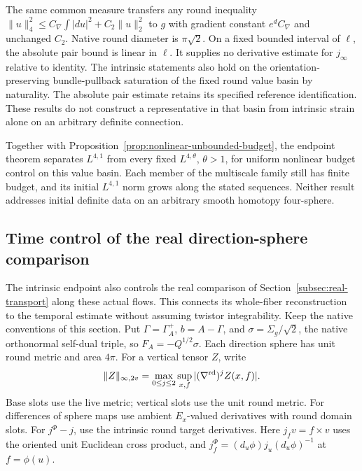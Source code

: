 \documentclass[11pt]{article}
\numberwithin{equation}{section}
\theoremstyle{definition}
\theoremstyle{remark}
\begin{document}
The same common measure transfers any round inequality
\(\|u\|_4^2\le C_\nabla\int|du|^2+C_2\|u\|_2^2\)
to \(g\) with gradient constant \(e^dC_\nabla\) and
unchanged \(C_2\). Native round diameter is \(\pi\sqrt2\).
On a fixed bounded interval of \(\ell\), the absolute
pair bound is linear in \(\ell\). It supplies no
derivative estimate for \(j_\infty\) relative to identity.
The intrinsic statements also hold on the orientation-preserving
bundle-pullback saturation of the fixed round value basin
by naturality.
The absolute pair estimate retains its specified reference
identification. These results do not construct a
representative in that basin from intrinsic strain alone
on an arbitrary definite connection.

Together with Proposition~\ref{prop:nonlinear-unbounded-budget},
the endpoint theorem separates \(L^{4,1}\) from every
fixed \(L^{4,\theta}\), \(\theta>1\), for uniform nonlinear
budget control on this value basin. Each member of the
multiscale family still has finite budget, and its
initial \(L^{4,1}\) norm grows along the stated sequences.
Neither result addresses initial definite data on
an arbitrary smooth homotopy four-sphere.


\subsection{Time control of the real direction-sphere comparison}
\label{subsec:real-comparison-time}

The intrinsic endpoint also controls the real comparison of
Section~\ref{subsec:real-transport} along these actual flows.
This connects its whole-fiber reconstruction to the temporal
estimate without assuming twistor integrability.
Keep the native conventions of this section. Put
\(\Gamma=\Gamma_A^+\), \(b=A-\Gamma\), and
\(\sigma=\Sigma_g/\sqrt2\), the native orthonormal self-dual
triple, so \(F_A=-Q^{1/2}\sigma\).
Each direction sphere has unit round metric and area \(4\pi\).
For a vertical tensor \(Z\), write
\[
 \|Z\|_{\infty,2v}
 =\max_{0\le j\le2}\sup_{x,f}|(\nabla^{\rm rd})^j Z(x,f)| .
\]
Base slots use the live metric; vertical slots use the unit
round metric. For differences of sphere maps use ambient
\(E_x\)-valued derivatives with round domain slots.
For \(j^\Phi-j\), use the intrinsic round target derivatives.
Here \(j_fv=f\times v\) uses the oriented unit Euclidean
cross product, and
\(j^\Phi_f=(d_u\phi)j_u(d_u\phi)^{-1}\) at \(f=\phi(u)\).
\end{document}
